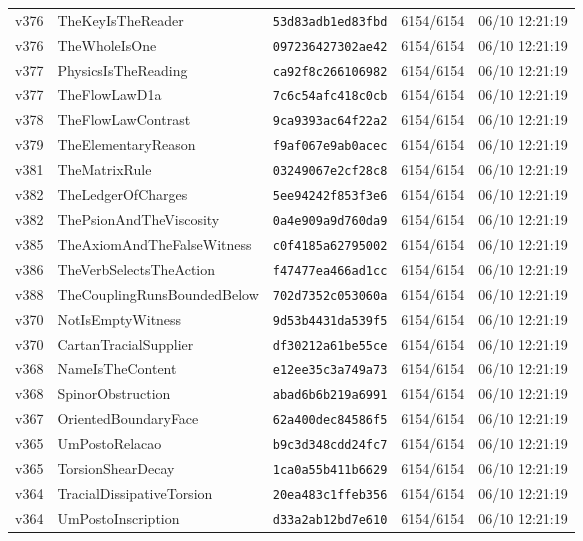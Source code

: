 \documentclass[11pt]{article}
\theoremstyle{definition}\newtheorem{deriv}{Derivation}
\begin{document}
{\begin{longtable}{@{}lllll@{}}
v376 & TheKeyIsTheReader & \texttt{53d83adb1ed83fbd} & 6154/6154 & 06/10 12:21:19 \\
v376 & TheWholeIsOne & \texttt{097236427302ae42} & 6154/6154 & 06/10 12:21:19 \\
v377 & PhysicsIsTheReading & \texttt{ca92f8c266106982} & 6154/6154 & 06/10 12:21:19 \\
v377 & TheFlowLawD1a & \texttt{7c6c54afc418c0cb} & 6154/6154 & 06/10 12:21:19 \\
v378 & TheFlowLawContrast & \texttt{9ca9393ac64f22a2} & 6154/6154 & 06/10 12:21:19 \\
v379 & TheElementaryReason & \texttt{f9af067e9ab0acec} & 6154/6154 & 06/10 12:21:19 \\
v381 & TheMatrixRule & \texttt{03249067e2cf28c8} & 6154/6154 & 06/10 12:21:19 \\
v382 & TheLedgerOfCharges & \texttt{5ee94242f853f3e6} & 6154/6154 & 06/10 12:21:19 \\
v382 & ThePsionAndTheViscosity & \texttt{0a4e909a9d760da9} & 6154/6154 & 06/10 12:21:19 \\
v385 & TheAxiomAndTheFalseWitness & \texttt{c0f4185a62795002} & 6154/6154 & 06/10 12:21:19 \\
v386 & TheVerbSelectsTheAction & \texttt{f47477ea466ad1cc} & 6154/6154 & 06/10 12:21:19 \\
v388 & TheCouplingRunsBoundedBelow & \texttt{702d7352c053060a} & 6154/6154 & 06/10 12:21:19 \\
v370 & NotIsEmptyWitness & \texttt{9d53b4431da539f5} & 6154/6154 & 06/10 12:21:19 \\
v370 & CartanTracialSupplier & \texttt{df30212a61be55ce} & 6154/6154 & 06/10 12:21:19 \\
v368 & NameIsTheContent & \texttt{e12ee35c3a749a73} & 6154/6154 & 06/10 12:21:19 \\
v368 & SpinorObstruction & \texttt{abad6b6b219a6991} & 6154/6154 & 06/10 12:21:19 \\
v367 & OrientedBoundaryFace & \texttt{62a400dec84586f5} & 6154/6154 & 06/10 12:21:19 \\
v365 & UmPostoRelacao & \texttt{b9c3d348cdd24fc7} & 6154/6154 & 06/10 12:21:19 \\
v365 & TorsionShearDecay & \texttt{1ca0a55b411b6629} & 6154/6154 & 06/10 12:21:19 \\
v364 & TracialDissipativeTorsion & \texttt{20ea483c1ffeb356} & 6154/6154 & 06/10 12:21:19 \\
v364 & UmPostoInscription & \texttt{d33a2ab12bd7e610} & 6154/6154 & 06/10 12:21:19 \\

\end{longtable}}
\end{document}
